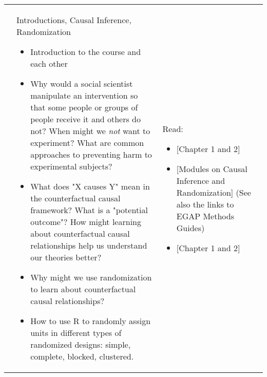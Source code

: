 \documentclass[letterpaper]{inzane_syllabus} %
\begin{document}
\begin{center}
    \begin{longtable}{>{\raggedright}p{1.5cm} @{\hskip 0.25cm} >{\raggedright} p{10cm} >{\raggedright\arraybackslash} p{8cm}} \arrayrulecolor{myCOLOR} \toprule
        \syldate{\today}  & Introductions, Causal Inference, Randomization 

        \begin{itemize}
            \item Introduction to the course and each other
            \item Why would a social scientist manipulate an intervention so
                that some people or groups of people receive it and others do
                not? When might we \emph{not} want to experiment?  What are
                common approaches to preventing harm to experimental subjects?
            \item What does "X causes Y" mean in the counterfactual causal
                framework? What is a "potential outcome"? How might learning
                about counterfactual causal relationships help us understand
                our theories better? 
            \item Why might we use randomization to learn about counterfactual
                causal relationships?
            \item How to use R to randomly assign units in different types of randomized designs: simple, complete, blocked, clustered.
        \end{itemize}
                          & 
                          Read:
                          \begin{itemize}
                              \item \cite{gerber2012field}[Chapter 1 and 2]
                              \item \cite{bowersVoorsIchino2021book}[Modules on Causal Inference and Randomization] (See also the links to EGAP Methods Guides)
                              \item \cite{rosenbaum2017}[Chapter 1 and 2]
                          \end{itemize}


\end{longtable}
\end{center}
\end{document}
